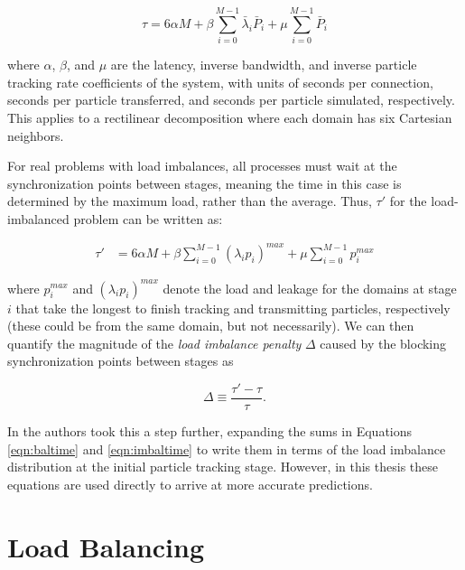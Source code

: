 \documentclass[12pt,twoside]{mitthesis-exec}
\begin{document}
\begin{equation}
    \tau = 6\alpha M + \beta \sum_{i=0}^{M-1} \bar\lambda_i \bar{P}_i + \mu \sum_{i=0}^{M-1} \bar{P}_i
    \label{eqn:baltime}
\end{equation}

\noindent where $\alpha$, $\beta$, and $\mu$ are the latency, inverse bandwidth,
and inverse particle tracking rate coefficients of the system, with units of
seconds per connection, seconds per particle transferred, and seconds per
particle simulated, respectively. This applies to a rectilinear decomposition
where each domain has six Cartesian neighbors.

For real problems with load imbalances, all processes must wait at the
synchronization points between stages, meaning the time in this case is 
determined by the maximum load, rather than the average.  Thus, $\tau'$
for the load-imbalanced problem can be written as:

\begin{equation}
    \begin{aligned}
    \tau' &= 6 \alpha M + 
      \beta \sum_{i=0}^{M-1} \left(\lambda_i p_i\right)^{max} +
      \mu \sum_{i=0}^{M-1} p_i^{max}
    \end{aligned}
    \label{eqn:imbaltime}
\end{equation}

\noindent where $p_i^{max}$ and $\left(\lambda_i p_i\right)^{max}$ denote the
load and leakage for the domains at stage $i$ that take the longest to finish
tracking and transmitting particles, respectively (these could be from the same
domain, but not necessarily). We can then quantify the magnitude of the
\emph{load imbalance penalty} $\Delta$ caused by the blocking synchronization
points between stages as

\begin{equation}
    \Delta \equiv \frac{\tau' - \tau}{\tau}.
    \label{eqn:penalty}
\end{equation}

In \cite{Siegel2} the authors took this a step further, expanding the sums in
Equations \ref{eqn:baltime} and \ref{eqn:imbaltime} to write them in terms of
the load imbalance distribution at the initial particle tracking stage. However,
in this thesis these equations are used directly to arrive at more accurate
predictions.

\section*{Load Balancing}
\end{document}
